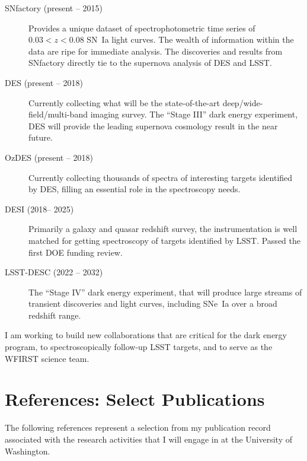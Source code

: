 \documentclass{article}
\begin{document}
\begin{description}
\item[SNfactory (present -- 2015)]  Provides a unique dataset of
spectrophotometric time series of $0.03<z<0.08$ SN~Ia light curves.  The wealth of information
within the data are ripe for immediate analysis. The discoveries and results from SNfactory directly tie to the supernova
analysis of DES and LSST.
\item[DES (present -- 2018)] Currently collecting what will be the state-of-the-art deep/wide-field/multi-band
imaging survey.   The ``Stage III'' dark energy experiment, DES will provide the leading supernova
cosmology result in the near future.
\item[OzDES (present -- 2018)] Currently collecting thousands of spectra of interesting targets identified by DES,
filling an essential role in the spectroscopy needs.
\item[DESI (2018-- 2025)]  Primarily a galaxy and quasar redshift survey, the instrumentation is well matched for
getting spectroscopy of targets identified by LSST. Passed the first DOE funding review.
\item[LSST-DESC (2022 -- 2032)]  The ``Stage IV'' dark energy experiment, that will produce large streams of
transient discoveries and light curves, including SNe~Ia over a broad redshift range.
\end{description}

I am working to build new collaborations that are critical for the dark energy program, 
to
spectroscopically follow-up LSST targets, and to serve as the WFIRST science team.


\section{References: Select Publications}
The following references represent a selection from my publication record associated with the research
activities that I will engage in at the University of Washington.



\end{document}

